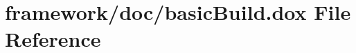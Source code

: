 \hypertarget{basic_build_8dox}{}\section{framework/doc/basic\+Build.dox File Reference}
\label{basic_build_8dox}
